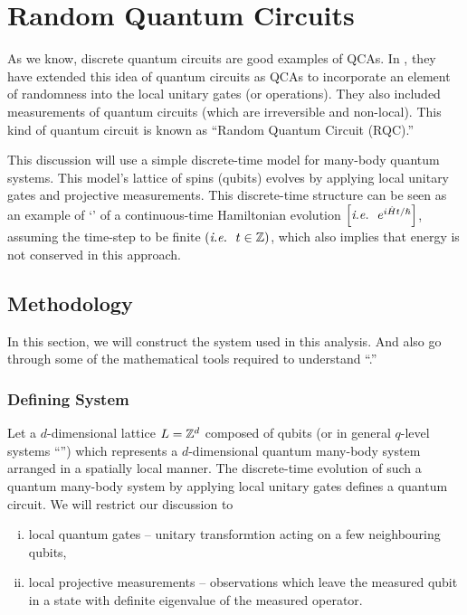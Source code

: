\documentclass[11pt, oneside]{scrbook}
\begin{document}
\chapter{Random Quantum Circuits}

As we know, discrete quantum circuits are good examples of QCAs. In \cite{Fisher2023}, they have extended this idea of quantum circuits as QCAs to incorporate an element of randomness into the local unitary gates (or operations). They also included measurements of quantum circuits (which are irreversible and non-local). This kind of quantum circuit is known as ``Random Quantum Circuit (RQC).''

This discussion will use a simple discrete-time model for many-body quantum systems. This model's lattice of spins (qubits) evolves by applying local unitary gates and projective measurements. This discrete-time structure can be seen as an example of `' of a continuous-time Hamiltonian evolution \(\qty[\textit{i.e.~} ~ e^{i \hat{H} t / \hslash}]\), assuming the time-step to be finite \(\qty(\textit{i.e.~} ~ t \in \mathbb Z)\), which also implies that energy is not conserved in this approach.

\section{Methodology}

In this section, we will construct the system used in this analysis. And also go through some of the mathematical tools required to understand ``.''

\subsection{Defining System}
Let a \(d\)-dimensional lattice \(L = \mathbb Z^{d}\) composed of qubits (or in general \(q\)-level systems ``'') which represents a \(d\)-dimensional quantum many-body system arranged in a spatially local manner. The discrete-time evolution of such a quantum many-body system by applying local unitary gates defines a quantum circuit. We will restrict our discussion to
\begin{enumerate}[(i), noitemsep]
    \item local quantum gates -- unitary transformtion acting on a few neighbouring qubits,
    \item local projective measurements -- observations which leave the measured qubit in a state with definite eigenvalue of the measured operator.
\end{enumerate}
\end{document}
